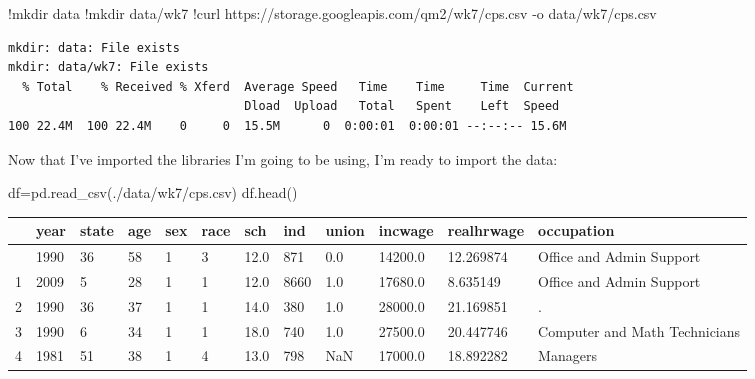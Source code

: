\documentclass[
  letterpaper,
  DIV=11,
  numbers=noendperiod]{scrreprt}
\newenvironment{Shaded}{\begin{snugshade}}{\end{snugshade}}
\newcommand{\NormalTok}[1]{\textcolor[rgb]{0.00,0.23,0.31}{#1}}
\newcommand{\OperatorTok}[1]{\textcolor[rgb]{0.37,0.37,0.37}{#1}}
\newcommand{\StringTok}[1]{\textcolor[rgb]{0.13,0.47,0.30}{#1}}
\begin{document}
\begin{Shaded}
\begin{Highlighting}[]
\OperatorTok{!}\NormalTok{mkdir data}
\OperatorTok{!}\NormalTok{mkdir data}\OperatorTok{/}\NormalTok{wk7}
\OperatorTok{!}\NormalTok{curl https:}\OperatorTok{//}\NormalTok{storage.googleapis.com}\OperatorTok{/}\NormalTok{qm2}\OperatorTok{/}\NormalTok{wk7}\OperatorTok{/}\NormalTok{cps.csv }\OperatorTok{{-}}\NormalTok{o data}\OperatorTok{/}\NormalTok{wk7}\OperatorTok{/}\NormalTok{cps.csv}
\end{Highlighting}
\end{Shaded}

\begin{verbatim}
mkdir: data: File exists
mkdir: data/wk7: File exists
  % Total    % Received % Xferd  Average Speed   Time    Time     Time  Current
                                 Dload  Upload   Total   Spent    Left  Speed
100 22.4M  100 22.4M    0     0  15.5M      0  0:00:01  0:00:01 --:--:-- 15.6M
\end{verbatim}

Now that I've imported the libraries I'm going to be using, I'm ready to
import the data:

\begin{Shaded}
\begin{Highlighting}[]
\NormalTok{df}\OperatorTok{=}\NormalTok{pd.read\_csv(}\StringTok{\textquotesingle{}./data/wk7/cps.csv\textquotesingle{}}\NormalTok{)}
\NormalTok{df.head()}
\end{Highlighting}
\end{Shaded}

\begin{longtable}[]{@{}llllllllllll@{}}
\toprule\noalign{}
& year & state & age & sex & race & sch & ind & union & incwage &
realhrwage & occupation \\
\midrule\noalign{}
\endhead
\bottomrule\noalign{}
\endlastfoot
0 & 1990 & 36 & 58 & 1 & 3 & 12.0 & 871 & 0.0 & 14200.0 & 12.269874 &
Office and Admin Support \\
1 & 2009 & 5 & 28 & 1 & 1 & 12.0 & 8660 & 1.0 & 17680.0 & 8.635149 &
Office and Admin Support \\
2 & 1990 & 36 & 37 & 1 & 1 & 14.0 & 380 & 1.0 & 28000.0 & 21.169851 &
. \\
3 & 1990 & 6 & 34 & 1 & 1 & 18.0 & 740 & 1.0 & 27500.0 & 20.447746 &
Computer and Math Technicians \\
4 & 1981 & 51 & 38 & 1 & 4 & 13.0 & 798 & NaN & 17000.0 & 18.892282 &
Managers \\
\end{longtable}
\end{document}
